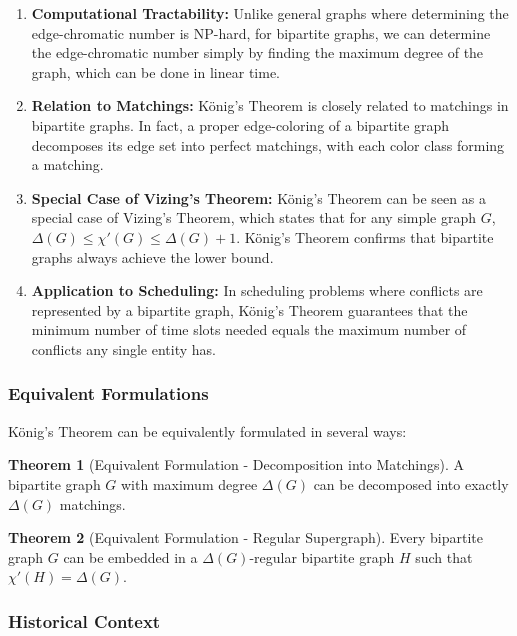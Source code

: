 \documentclass{article}
\theoremstyle{definition}
\newtheorem{theorem}{Theorem}
\begin{document}
\begin{enumerate}
\item \textbf{Computational Tractability:} Unlike general graphs where determining the edge-chromatic number is NP-hard, for bipartite graphs, we can determine the edge-chromatic number simply by finding the maximum degree of the graph, which can be done in linear time.

\item \textbf{Relation to Matchings:} König's Theorem is closely related to matchings in bipartite graphs. In fact, a proper edge-coloring of a bipartite graph decomposes its edge set into perfect matchings, with each color class forming a matching.

\item \textbf{Special Case of Vizing's Theorem:} König's Theorem can be seen as a special case of Vizing's Theorem, which states that for any simple graph $G$, $\Delta(G) \leq \chi'(G) \leq \Delta(G) + 1$. König's Theorem confirms that bipartite graphs always achieve the lower bound.

\item \textbf{Application to Scheduling:} In scheduling problems where conflicts are represented by a bipartite graph, König's Theorem guarantees that the minimum number of time slots needed equals the maximum number of conflicts any single entity has.
\end{enumerate}

\subsubsection{Equivalent Formulations}

König's Theorem can be equivalently formulated in several ways:

\begin{theorem}[Equivalent Formulation - Decomposition into Matchings]
A bipartite graph $G$ with maximum degree $\Delta(G)$ can be decomposed into exactly $\Delta(G)$ matchings.
\end{theorem}

\begin{theorem}[Equivalent Formulation - Regular Supergraph]
Every bipartite graph $G$ can be embedded in a $\Delta(G)$-regular bipartite graph $H$ such that $\chi'(H) = \Delta(G)$.
\end{theorem}

\subsubsection{Historical Context}
\end{document}
